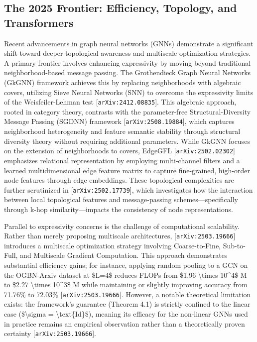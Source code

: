 \documentclass[11pt]{article}
\begin{document}
\subsection{The 2025 Frontier: Efficiency, Topology, and Transformers}

Recent advancements in graph neural networks (GNNs) demonstrate a significant shift toward deeper topological awareness and multiscale optimization strategies. A primary frontier involves enhancing expressivity by moving beyond traditional neighborhood-based message passing. The Grothendieck Graph Neural Networks (GkGNN) framework achieves this by replacing neighborhoods with algebraic covers, utilizing Sieve Neural Networks (SNN) to overcome the expressivity limits of the Weisfeiler-Lehman test [\texttt{arXiv:2412.08835}]. This algebraic approach, rooted in category theory, contrasts with the parameter-free Structural-Diversity Message Passing (SGDNN) framework [\texttt{arXiv:2508.19884}], which captures neighborhood heterogeneity and feature semantic stability through structural diversity theory without requiring additional parameters. While GkGNN focuses on the extension of neighborhoods to covers, EdgeGFL [\texttt{arXiv:2502.02302}] emphasizes relational representation by employing multi-channel filters and a learned multidimensional edge feature matrix to capture fine-grained, high-order node features through edge embeddings. These topological complexities are further scrutinized in [\texttt{arXiv:2502.17739}], which investigates how the interaction between local topological features and message-passing schemes—specifically through k-hop similarity—impacts the consistency of node representations.

Parallel to expressivity concerns is the challenge of computational scalability. Rather than merely proposing multiscale architectures, [\texttt{arXiv:2503.19666}] introduces a multiscale optimization strategy involving Coarse-to-Fine, Sub-to-Full, and Multiscale Gradient Computation. This approach demonstrates substantial efficiency gains; for instance, applying random pooling to a GCN on the OGBN-Arxiv dataset at \$L=4\$ reduces FLOPs from \$1.96 \textbackslash{}times 10\textasciicircum{}4\$ M to \$2.27 \textbackslash{}times 10\textasciicircum{}3\$ M while maintaining or slightly improving accuracy from 71.76\% to 72.03\% [\texttt{arXiv:2503.19666}]. However, a notable theoretical limitation exists: the framework's guarantee (Theorem 4.1) is strictly confined to the linear case (\$\textbackslash{}sigma = \textbackslash{}text\{Id\}\$), meaning its efficacy for the non-linear GNNs used in practice remains an empirical observation rather than a theoretically proven certainty [\texttt{arXiv:2503.19666}].
\end{document}
